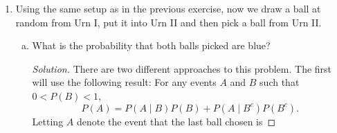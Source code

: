\documentclass[12pt]{article}
\newenvironment{solution}
{\renewcommand\qedsymbol{$\blacksquare$}\begin{proof}[Solution]}
{\end{proof}}
\begin{document}
\begin{enumerate}
\begin{enumerate}[(a)]
\begin{solution}
        that $(\Omega, \mathcal{F}, P)$ is an equiprobability space.
    \end{solution} \item What is the probability that the ball picked is blue?
    \begin{solution} The event of picking a blue ball can be expressed as the
        set \begin{equation*} B=\{b_{11}, b_{12}, b_{13}, b_{21}, b_{22},
            b_{23}, b_{24}\}.  \end{equation*} Since $B\subset\Omega$, then
        $B\in\mathcal{F}$ and therefore measureable. And so \begin{equation*}
    P(B)=\frac{|B|}{|\Omega|}=\frac{7}{12}.  \end{equation*} \end{solution}
\item Given that the ball picked is blue, what is the probability that it comes
    from Urn I?  \begin{solution} Let $A$ denote the event of selecting Urn
        I and let $B$ denote the event that a blue ball was selected. Then
        \begin{align*} A&=\{w_{11}, w_{12}, b_{11}, b_{12}, b_{13}\} \\
        B&=\{b_{11}, b_{12}, b_{13}, b_{21}, b_{22}, b_{23}, b_{24}\}.
    \end{align*} Thus the probability of $A$ given $B$ is \begin{equation*}
        P(A|B)=\frac{P(A\cap B)}{P(B)}=\frac{3}{7}.  \end{equation*}
        \end{solution} \end{enumerate} \item Using the same setup as in the
        previous exercise, now we draw a ball at random from Urn I, put it into
        Urn II and then pick a ball from Urn II.  \begin{enumerate}[(a)] \item
                What is the probability that both balls picked are blue?
                \begin{solution} There are two different approaches to this
                    problem. The first will use the following result: For any
                    events $A$ and $B$ such that $0<P(B)<1$, \begin{equation*}
                    P(A)=P(A\mid B)P(B)+P(A\mid B^c)P(B^c).  \end{equation*}
                    Letting $A$ denote the event that the last ball chosen is

\end{solution}
\end{enumerate}
\end{enumerate}
\end{document}
